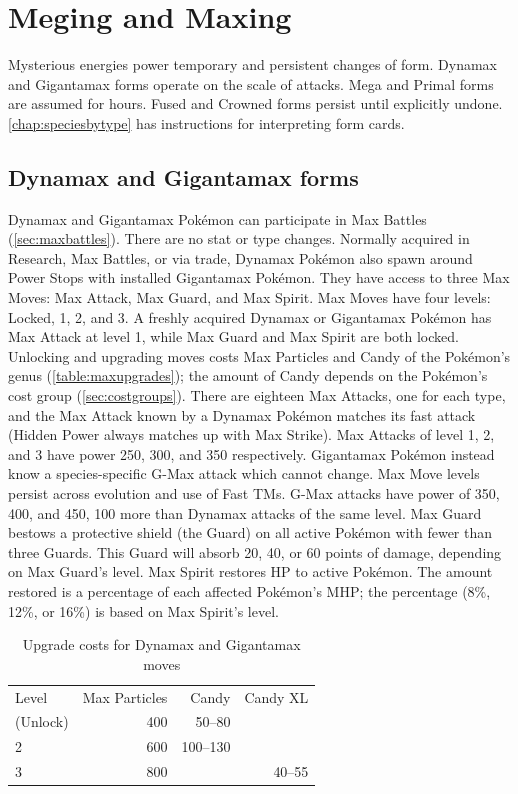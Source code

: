 \chapter{Meging and Maxing\label{chap:megmax}}
Mysterious energies power temporary and persistent changes of form.
Dynamax and Gigantamax forms operate on the scale of attacks.
Mega and Primal forms are assumed for hours.
Fused and Crowned forms persist until explicitly undone.
\autoref{chap:speciesbytype} has instructions for interpreting form cards.

\section{Dynamax and Gigantamax forms\label{sec:dmaxgmax}}
Dynamax and Gigantamax Pokémon can participate in Max Battles (\autoref{sec:maxbattles}).
There are no stat or type changes.
Normally acquired in Research, Max Battles, or via trade,
 Dynamax Pokémon also spawn around Power Stops with installed Gigantamax Pokémon.
They have access to three Max Moves: Max Attack, Max Guard, and Max Spirit.
Max Moves have four levels: Locked, 1, 2, and 3.
A freshly acquired Dynamax or Gigantamax Pokémon has Max Attack at level 1, while Max Guard and Max Spirit are both locked.
Unlocking and upgrading moves costs Max Particles and Candy of the Pokémon's genus (\autoref{table:maxupgrades});
 the amount of Candy depends on the Pokémon's cost group (\autoref{sec:costgroups}).
There are eighteen Max Attacks, one for each type, and the Max Attack known by a Dynamax Pokémon matches its fast attack
 (Hidden Power always matches up with Max Strike).
Max Attacks of level 1, 2, and 3 have power 250, 300, and 350 respectively.
Gigantamax Pokémon instead know a species-specific G-Max attack which cannot change.
Max Move levels persist across evolution and use of Fast TMs.
G-Max attacks have power of 350, 400, and 450, 100 more than Dynamax attacks of the same level.
Max Guard bestows a protective shield (the Guard) on all active Pokémon
  with fewer than three Guards.
This Guard will absorb 20, 40, or 60 points of damage, depending on Max Guard's level.
Max Spirit restores HP to active Pokémon.
The amount restored is a percentage of each affected Pokémon's MHP\@;
  the percentage (8\%, 12\%, or 16\%) is based on Max Spirit's level.
\begin{table}
\centering
\begin{tabular}{lrrr}
Level & Max Particles & Candy & Candy XL\\
\Midrule
1 (Unlock) & 400 & 50--80 &\\
2          & 600 & 100--130 &\\
3          & 800 & & 40--55\\
\end{tabular}
\caption{Upgrade costs for Dynamax and Gigantamax moves\label{table:maxupgrades}}
\end{table}

